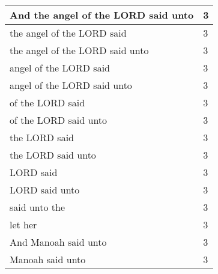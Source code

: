 \begin{center}
\begin{longtable}{|p{3.0in}|p{0.5in}|}
And the angel of the LORD said unto & 3\\ \hline 
the angel of the LORD said & 3\\ \hline 
the angel of the LORD said unto & 3\\ \hline 
angel of the LORD said & 3\\ \hline 
angel of the LORD said unto & 3\\ \hline 
of the LORD said & 3\\ \hline 
of the LORD said unto & 3\\ \hline 
the LORD said & 3\\ \hline 
the LORD said unto & 3\\ \hline 
LORD said & 3\\ \hline 
LORD said unto & 3\\ \hline 
said unto the & 3\\ \hline 
let her & 3\\ \hline 
And Manoah said unto & 3\\ \hline 
Manoah said unto & 3\\ \hline 
\end{longtable}
\end{center}





